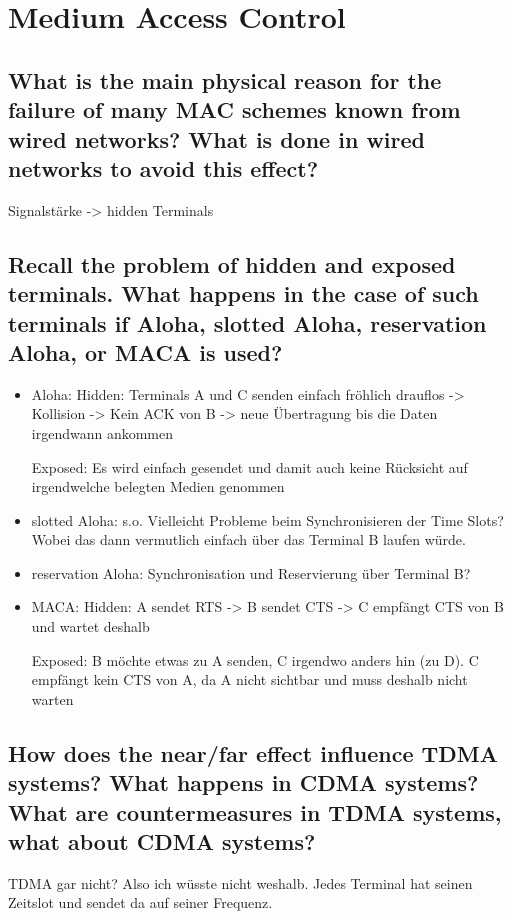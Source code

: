 \section{Medium Access Control}

\subsection{What is the main physical reason for the failure of many MAC schemes known from
wired networks? What is done in wired networks to avoid this effect?}
Signalstärke -> hidden Terminals


\subsection{Recall the problem of hidden and exposed terminals. What happens in the case of
such terminals if Aloha, slotted Aloha, reservation Aloha, or MACA is used?}
\begin{itemize}

\item Aloha: Hidden: Terminals A und C senden einfach fröhlich drauflos -> Kollision -> Kein ACK von B -> neue Übertragung bis die Daten irgendwann ankommen

Exposed: Es wird einfach gesendet und damit auch keine Rücksicht auf irgendwelche belegten Medien genommen

\item slotted Aloha: s.o. Vielleicht Probleme beim Synchronisieren der Time Slots? Wobei das dann vermutlich einfach über das Terminal B laufen würde.

\item reservation Aloha: Synchronisation und Reservierung über Terminal B? 

\item MACA: Hidden: A sendet RTS -> B sendet CTS -> C empfängt CTS von B und wartet deshalb

Exposed: B möchte etwas zu A senden, C irgendwo anders hin (zu D). C empfängt kein CTS von A, da A nicht sichtbar und muss deshalb nicht warten

\end{itemize}

\subsection{How does the near/far effect influence TDMA systems? What happens in CDMA
systems? What are countermeasures in TDMA systems, what about CDMA systems?}
TDMA gar nicht? Also ich wüsste nicht weshalb. Jedes Terminal hat seinen Zeitslot und sendet da auf seiner Frequenz.

